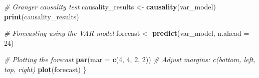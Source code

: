 \documentclass[
]{article}
\newenvironment{Shaded}{\begin{snugshade}}{\end{snugshade}}
\newcommand{\AttributeTok}[1]{\textcolor[rgb]{0.13,0.29,0.53}{#1}}
\newcommand{\CommentTok}[1]{\textcolor[rgb]{0.56,0.35,0.01}{\textit{#1}}}
\newcommand{\DecValTok}[1]{\textcolor[rgb]{0.00,0.00,0.81}{#1}}
\newcommand{\FunctionTok}[1]{\textcolor[rgb]{0.13,0.29,0.53}{\textbf{#1}}}
\newcommand{\NormalTok}[1]{#1}
\newcommand{\OtherTok}[1]{\textcolor[rgb]{0.56,0.35,0.01}{#1}}
\begin{document}
\begin{Shaded}
\begin{Highlighting}[]
  \CommentTok{\# Granger causality test}
\NormalTok{  causality\_results }\OtherTok{\textless{}{-}} \FunctionTok{causality}\NormalTok{(var\_model)}
  \FunctionTok{print}\NormalTok{(causality\_results)}
  
  \CommentTok{\# Forecasting using the VAR model}
\NormalTok{  forecast }\OtherTok{\textless{}{-}} \FunctionTok{predict}\NormalTok{(var\_model, }\AttributeTok{n.ahead =} \DecValTok{24}\NormalTok{)}
  
  \CommentTok{\# Plotting the forecast}
  \FunctionTok{par}\NormalTok{(}\AttributeTok{mar =} \FunctionTok{c}\NormalTok{(}\DecValTok{4}\NormalTok{, }\DecValTok{4}\NormalTok{, }\DecValTok{2}\NormalTok{, }\DecValTok{2}\NormalTok{))  }\CommentTok{\# Adjust margins: c(bottom, left, top, right)}
  \FunctionTok{plot}\NormalTok{(forecast)}
\NormalTok{\}}
\end{Highlighting}
\end{Shaded}
\end{document}
